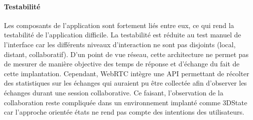 			\paragraph{Testabilité}
Les composants de l'application sont fortement liés 
entre eux, ce qui rend la testabilité de l'application difficile. La testabilité est 
réduite au test manuel de l'interface car les différents niveaux d'interaction ne sont 
pas disjoints (local, distant, collaboratif). D'un point de vue réseau, cette 
architecture ne permet pas de mesurer de manière objective des temps de 
réponse et d'échange du fait de cette implantation. Cependant, WebRTC intègre 
une API permettant de récolter des statistiques sur les échanges qui auraient pu 
être collectée afin d'observer les échanges durant une session collaborative. Ce 
faisant, l'observation de la collaboration reste compliquée dans un environnement 
implanté comme 3DState car l'approche orientée états ne rend pas compte des 
intentions des utilisateurs.



